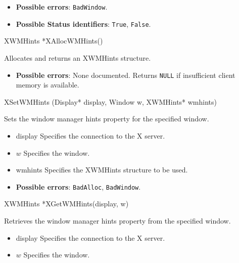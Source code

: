 \documentclass{report}
\begin{document}
\begin{itemize}
            \begin{itemize}
                \item \textbf{Possible errors}: \texttt{BadWindow}.
                \item \textbf{Possible Status identifiers}: \texttt{True}, \texttt{False}.
            \end{itemize}

            \begin{cppcode}
            XWMHints *XAllocWMHints()
            \end{cppcode}
            \bigbreak \noindent
            Allocates and returns an XWMHints structure.

            \begin{itemize}
                \item \textbf{Possible errors}: None documented. Returns \texttt{NULL} if insufficient client memory is available.
            \end{itemize}

            \begin{cppcode}
            XSetWMHints (Display* display, Window w, XWMHints* wmhints)
            \end{cppcode}
            \bigbreak \noindent
            Sets the window manager hints property for the specified window.

            \begin{itemize}
                \item display Specifies the connection to the X server.
                \item $w$ Specifies the window.
                \item wmhints Specifies the XWMHints structure to be used.
            \end{itemize}

            \begin{itemize}
                \item \textbf{Possible errors}: \texttt{BadAlloc}, \texttt{BadWindow}.
            \end{itemize}

            \begin{cppcode}
                XWMHints *XGetWMHints(display, w)
            \end{cppcode}
            \bigbreak \noindent
            Retrieves the window manager hints property from the specified window.

            \begin{itemize}
                \item display Specifies the connection to the X server.
                \item $w$ Specifies the window.
            \end{itemize}


\end{itemize}
\end{document}
